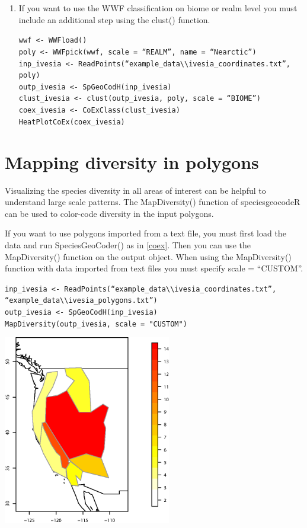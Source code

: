 \documentclass[a4paper,titlepage,11pt]{scrreprt}
\begin{document}
\begin{enumerate}
\item{If you want to use the WWF classification on biome or realm level you must include an additional step using the clust() function.}

\texttt{wwf \textless- WWFload()}\\
\texttt{poly \textless- WWFpick(wwf, scale = ``REALM'', name  = ``Nearctic'')}\\
\texttt{inp\_ivesia  \textless- ReadPoints(``example\_data\textbackslash \textbackslash ivesia\_coordinates.txt'', poly)}\\
\texttt{outp\_ivesia \textless- SpGeoCodH(inp\_ivesia)}\\
\texttt{clust\_ivesia \textless- clust(outp\_ivesia, poly, scale = ``BIOME'')}\\
\texttt{coex\_ivesia \textless- CoExClass(clust\_ivesia)}\\
\texttt{HeatPlotCoEx(coex\_ivesia)}

\end{enumerate}

\section{Mapping diversity in polygons}
Visualizing the species diversity in all areas of interest can be helpful to understand large scale patterns. The MapDiversity() function of speciesgeocodeR can be used to color-code diversity in the input polygons. 

If you want to use polygons imported from a text file, you must first load the data and run SpeciesGeoCoder() as in \ref{coex}. Then you can use the MapDiversity() function on the output object. When using the MapDiversity() function with data imported from text files you must specify scale = ``CUSTOM''.

\texttt{inp\_ivesia  \textless- ReadPoints(``example\_data\textbackslash \textbackslash ivesia\_coordinates.txt'', }\\
\texttt{``example\_data\textbackslash \textbackslash ivesia\_polygons.txt'')}\\
\texttt{outp\_ivesia \textless- SpGeoCodH(inp\_ivesia)}\\
\texttt{MapDiversity(outp\_ivesia, scale = "CUSTOM")}

\begin{center}
\includegraphics[width=0.55\textwidth]{figures/mapdiversity_continous.eps}
\end{center}
\end{document}
